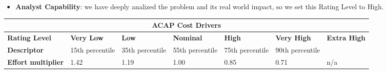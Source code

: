 \begin{itemize}
\item \textbf{Analyst Capability}: we have deeply analized the problem and its real world impact, so we set this Rating Level to High.
\end{itemize}
\hspace*{-3cm}\begin{tabular}{|p{3cm}|p{2cm}|p{2cm}|p{2cm}|p{2cm}|p{2cm}|p{2cm}|}
\hline
\multicolumn{7}{|c|}{\textbf{ACAP Cost Drivers}}\\
\hline
\hline
\textbf{Rating Level} & \textbf{Very Low} & \textbf{Low} & \textbf{Nominal} & \textbf{High} & \textbf{Very High} & \textbf{Extra High}\\
\hline
\textbf{Descriptor} & 15th percentile & 35th percentile & 55th percentile & 75th percentile & 90th percentile & \\
\hline
\textbf{Effort multiplier} & 1.42 & 1.19 & 1.00 & 0.85 & 0.71 & n/a\\
\hline 
\end{tabular}